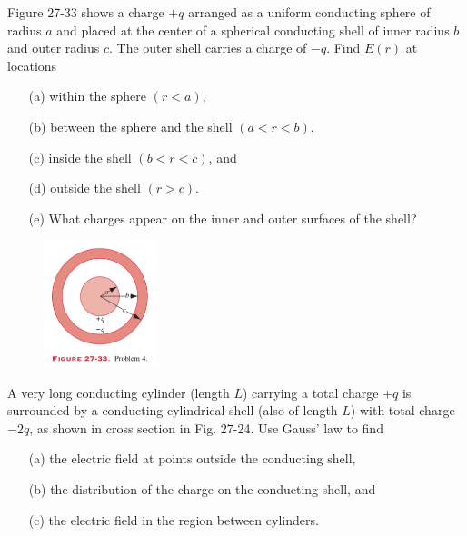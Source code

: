 \documentclass[11pt,letterpaper,boxed]{pset}
\begin{document}
    \begin{problem} [P27.4]
    	Figure 27-33 shows a charge $+q$ arranged as a uniform conducting sphere of radius $a$ and placed at the center of a spherical conducting shell of inner radius $b$ and outer radius $c$. The outer shell carries a charge of $-q$. Find $E(r)$ at locations
    	
    	\begin{itemize}
    	    \item [(a)] within the sphere $(r<a)$,
    	    \item [(b)] between the sphere and the shell $(a<r<b)$,
    	    \item [(c)] inside the shell $(b<r<c)$, and
    	    \item [(d)] outside the shell $(r>c)$.
    	    \item [(e)] What charges appear on the inner and outer surfaces of the shell?
    	\end{itemize}
    \end{problem}
    
    \begin{figure} [ht]
        \includegraphics[width=125px]{HW2Images/P27-4.png}
        \label{fig:P27-4}
    \end{figure}
    \newpage
    
    \begin{problem} [P27.5]
    	A very long conducting cylinder (length $L$) carrying a total charge $+q$ is surrounded by a conducting cylindrical shell (also of length $L$) with total charge $-2q$, as shown in cross section in Fig. 27-24. Use Gauss' law to find 
    	
    	
    	\begin{itemize}
    	    \item [(a)] the electric field at points outside the conducting shell,
    	    \item [(b)] the distribution of the charge on the conducting shell, and 
    	    \item [(c)] the electric field in the region between cylinders.
    	\end{itemize}
    \end{problem}
    
\end{document}
